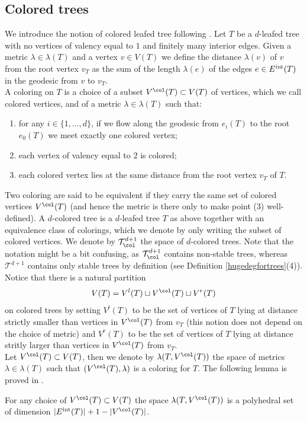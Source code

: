 	
	\subsection{Colored trees}\label{colored trees}
	
	We introduce the notion of colored leafed tree following \cite{Mau2010GeometricMultiplihedra}. Let $T$ be a $d$-leafed tree with no vertices of valency equal to $1$ and finitely many interior edges. Given a metric $\lambda\in \lambda(T)$ and a vertex $v\in V(T)$ we define the distance $\lambda(v)$ of $v$ from the root vertex $v_T$ as the sum of the length $\lambda(e)$ of the edges $e\in E^\textnormal{int}(T)$ in the geodesic from $v$ to $v_T$.\\
	A coloring on $T$ is a choice of a subset $V^\col(T)\subset V(T)$ of vertices, which we call colored vertices, and of a metric $\lambda\in \lambda(T)$ such that: \begin{enumerate}
		\item for any $i\in \{1,\ldots, d\}$, if we flow along the geodesic from $e_i(T)$ to the root $e_0(T)$ we meet exactly one colored vertex;
		\item each vertex of valency equal to $2$ is colored;
		\item each colored vertex lies at the same distance from the root vertex $v_T$ of $T$.
	\end{enumerate}
	Two coloring are said to be equivalent if they carry the same set of colored vertices $V^\col(T)$ (and hence the metric is there only to make point (3) well-defined). A $d$-colored tree is a $d$-leafed tree $T$ as above together with an equivalence class of colorings, which we denote by only writing the subset of colored vertices. We denote by $\mathcal{T}^{d+1}_\col$ the space of $d$-colored trees. Note that the notation might be a bit confusing, as $\mathcal{T}^{d+1}_\col$ contains non-stable trees, whereas $\mathcal{T}^{d+1}$ contains only stable trees by definition (see Definition \ref{hugedegfortrees}(4)). Notice that there is a natural partition $$V(T)=V^l(T)\sqcup V^\col(T)\sqcup V^r(T)$$ on colored trees by setting $V^l(T)$ to be the set of vertices of $T$ lying at distance strictly smaller than vertices in $V^\col(T)$ from $v_T$ (this notion does not depend on the choice of metric) and $V^r(T)$ to be the set of vertices of $T$ lying at distance stritly larger than vertices in $V^\col(T)$ from $v_T$.\\ Let $V^\col(T)\subset V(T)$, then we denote by $\lambda(T,V^\col(T))$ the space of metrics $\lambda\in \lambda(T)$ such that $(V^\col(T), \lambda)$ is a coloring for $T$. The following lemma is proved in \cite{Mau2010GeometricMultiplihedra}.
	\begin{lemma}\label{polcone}
		For any choice of $V^\col(T)\subset V(T)$ the space $\lambda(T,V^\col(T))$ is a polyhedral set of dimension $|E^\textnormal{int}(T)|+1-|V^\col(T)|$.
	\end{lemma}
	
